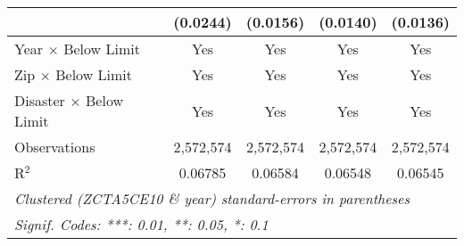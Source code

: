 \begin{tabular*}{0.8\textwidth}{@{\extracolsep{\fill}}lcccc}
                                                    & (0.0244)        & (0.0156)        & (0.0140)        & (0.0136)\\   
   \midrule
   Year $\times$ Below Limit                        & Yes             & Yes             & Yes             & Yes\\  
   Zip $\times$ Below Limit                         & Yes             & Yes             & Yes             & Yes\\  
   Disaster $\times$ Below Limit                    & Yes             & Yes             & Yes             & Yes\\  
   \midrule
   Observations                                        & 2,572,574       & 2,572,574       & 2,572,574       & 2,572,574\\  
   R$^2$                                               & 0.06785         & 0.06584         & 0.06548         & 0.06545\\  
   \bottomrule
   \multicolumn{5}{l}{\emph{Clustered (ZCTA5CE10 \& year) standard-errors in parentheses}}\\
   \multicolumn{5}{l}{\emph{Signif. Codes: ***: 0.01, **: 0.05, *: 0.1}}\\
\end{tabular*}
